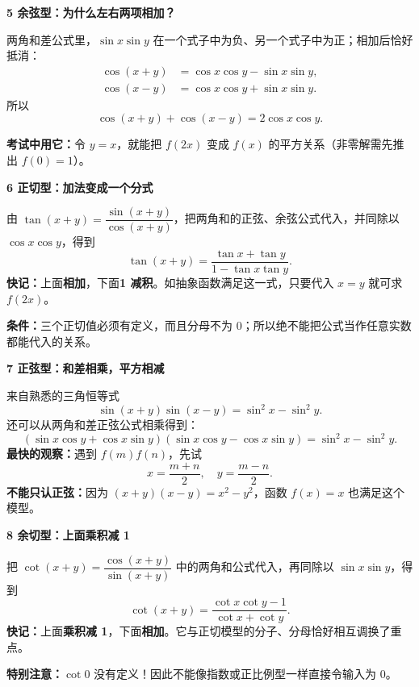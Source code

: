 \FReserve{7.5cm}
\begin{explanationbox}
\textbf{\textcolor{CExplanation}{5 余弦型：为什么左右两项相加？}}


两角和差公式里，$\sin x\sin y$ 在一个式子中为负、另一个式子中为正；相加后恰好抵消：
\[
\begin{aligned}
\cos(x+y)&=\cos x\cos y-\sin x\sin y,\\
\cos(x-y)&=\cos x\cos y+\sin x\sin y.
\end{aligned}
\]
所以
\[\boxed{\cos(x+y)+\cos(x-y)=2\cos x\cos y}.\]

\textbf{考试中用它：}令 $y=x$，就能把 $f(2x)$ 变成 $f(x)$ 的平方关系（非零解需先推出 $f(0)=1$）。
\end{explanationbox}

\FReserve{7.5cm}
\begin{explanationbox}
\textbf{\textcolor{CExplanation}{6 正切型：加法变成一个分式}}


由 $\tan(x+y)=\dfrac{\sin(x+y)}{\cos(x+y)}$，把两角和的正弦、余弦公式代入，并同除以 $\cos x\cos y$，得到
\[
\boxed{\tan(x+y)=\frac{\tan x+\tan y}{1-\tan x\tan y}}.
\]
\textbf{快记：}上面\textbf{相加}，下面\textbf{1 减积}。如抽象函数满足这一式，只要代入 $x=y$ 就可求 $f(2x)$。

\textbf{条件：}三个正切值必须有定义，而且分母不为 $0$；所以绝不能把公式当作任意实数都能代入的关系。
\end{explanationbox}

\FReserve{7.5cm}
\begin{explanationbox}
\textbf{\textcolor{CExplanation}{7 正弦型：和差相乘，平方相减}}


来自熟悉的三角恒等式
\[
\boxed{\sin(x+y)\sin(x-y)=\sin^2x-\sin^2y}.
\]
还可以从两角和差正弦公式相乘得到：
\[
(\sin x\cos y+\cos x\sin y)
(\sin x\cos y-\cos x\sin y)
=\sin^2x-\sin^2y.
\]
\textbf{最快的观察：}遇到 $f(m)f(n)$，先试
\[x=\frac{m+n}{2},\quad y=\frac{m-n}{2}.\]
\textbf{不能只认正弦：}因为 $(x+y)(x-y)=x^2-y^2$，函数 $f(x)=x$ 也满足这个模型。
\end{explanationbox}

\FReserve{7.5cm}
\begin{explanationbox}
\textbf{\textcolor{CExplanation}{8 余切型：上面乘积减 1}}


把 $\cot(x+y)=\dfrac{\cos(x+y)}{\sin(x+y)}$ 中的两角和公式代入，再同除以 $\sin x\sin y$，得到
\[
\boxed{\cot(x+y)=\frac{\cot x\cot y-1}{\cot x+\cot y}}.
\]
\textbf{快记：}上面\textbf{乘积减 1}，下面\textbf{相加}。它与正切模型的分子、分母恰好相互调换了重点。

\textbf{特别注意：}$\cot0$ 没有定义！因此不能像指数或正比例型一样直接令输入为 $0$。
\end{explanationbox}

